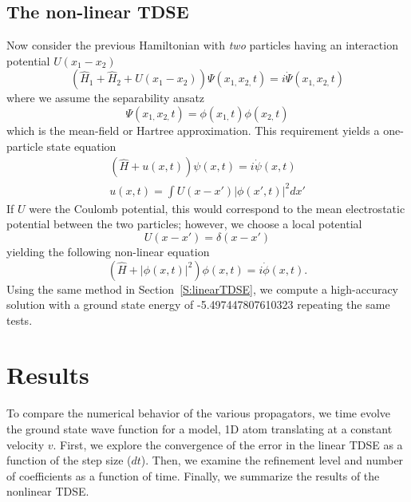 \documentclass[review,letterpaper]{elsarticle}
\begin{document}
\subsection{The non-linear TDSE}
\label{S:nonLinearTDSE}
Now consider the previous Hamiltonian with \emph{two} particles having an interaction potential  $U(x_1 - x_2)$
\begin{equation}
\left(\hat{H}_1+\hat{H}_2+U(x_{1}-x_{2})\right)\Psi (x_{1,}x_{2,}t)=i\dot{\Psi }(x_{1,}x_{2,}t)
\end{equation}
where we assume the separability ansatz
\begin{equation}
\Psi (x_{1,}x_{2,}t)=\phi (x_{1,}t)\phi (x_{2,}t)
\end{equation}
which is the mean-field or Hartree approximation.
This requirement yields a one-particle state equation
\begin{gather}
\left(\hat{H}+u(x,t)\right)\psi (x,t)=i\dot{\psi}(x,t) \\
u(x,t) =\int U(x-x'){\left|{\phi (x',t)}\right|}^{2}dx'
\end{gather}
If  $U$ were the Coulomb potential, this would correspond to the mean electrostatic potential between
the two particles; however, we choose a local potential
\begin{equation}
U(x-x')=\delta (x-x')
\end{equation}
yielding the following non-linear equation
\begin{equation}
\left(\hat{H}+{\left|{\phi (x,t)}\right|}^{2}\right)\phi (x,t)=i\dot{\phi}(x,t).
\end{equation}
Using the same method in Section~\ref{S:linearTDSE},
we compute a high-accuracy solution with a ground state energy
of -5.497447807610323 repeating the same tests.




\section{Results}
\label{S:Results}
To compare the numerical behavior of the various propagators, we time evolve
the ground state wave function for a model, 1D atom translating at a constant velocity  $v$.
First, we explore the convergence of the error in the linear TDSE as a function of the step size ($dt$).
Then, we examine the refinement level and number of coefficients as a function of time.
Finally, we summarize the results of the nonlinear TDSE.
\end{document}
